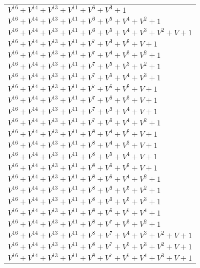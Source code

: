 \documentclass[12pt]{article}
\begin{document}
\begin{adjustwidth}{-4cm}{}
\begin{center}
\begin{longtable}{|l|}
$V^{16}  +V^{14}  +V^{13}  +V^{11}  +V^{6}  +V^{3}  + 1$ \\
$V^{16}  +V^{14}  +V^{13}  +V^{11}  +V^{6}  +V^{5}  +V^{4}  +V^{2}  + 1$ \\
$V^{16}  +V^{14}  +V^{13}  +V^{11}  +V^{6}  +V^{5}  +V^{4}  +V^{3}  +V^{2}  + V + 1$ \\
$V^{16}  +V^{14}  +V^{13}  +V^{11}  +V^{7}  +V^{3}  +V^{2}  + V + 1$ \\
$V^{16}  +V^{14}  +V^{13}  +V^{11}  +V^{7}  +V^{4}  +V^{3}  +V^{2}  + 1$ \\
$V^{16}  +V^{14}  +V^{13}  +V^{11}  +V^{7}  +V^{5}  +V^{3}  +V^{2}  + 1$ \\
$V^{16}  +V^{14}  +V^{13}  +V^{11}  +V^{7}  +V^{5}  +V^{4}  +V^{3}  + 1$ \\
$V^{16}  +V^{14}  +V^{13}  +V^{11}  +V^{7}  +V^{6}  +V^{2}  + V + 1$ \\
$V^{16}  +V^{14}  +V^{13}  +V^{11}  +V^{7}  +V^{6}  +V^{3}  + V + 1$ \\
$V^{16}  +V^{14}  +V^{13}  +V^{11}  +V^{7}  +V^{6}  +V^{4}  + V + 1$ \\
$V^{16}  +V^{14}  +V^{13}  +V^{11}  +V^{7}  +V^{6}  +V^{4}  +V^{2}  + 1$ \\
$V^{16}  +V^{14}  +V^{13}  +V^{11}  +V^{8}  +V^{4}  +V^{2}  + V + 1$ \\
$V^{16}  +V^{14}  +V^{13}  +V^{11}  +V^{8}  +V^{4}  +V^{3}  + V + 1$ \\
$V^{16}  +V^{14}  +V^{13}  +V^{11}  +V^{8}  +V^{5}  +V^{4}  + V + 1$ \\
$V^{16}  +V^{14}  +V^{13}  +V^{11}  +V^{8}  +V^{6}  +V^{2}  + V + 1$ \\
$V^{16}  +V^{14}  +V^{13}  +V^{11}  +V^{8}  +V^{6}  +V^{4}  +V^{2}  + 1$ \\
$V^{16}  +V^{14}  +V^{13}  +V^{11}  +V^{8}  +V^{6}  +V^{5}  +V^{2}  + 1$ \\
$V^{16}  +V^{14}  +V^{13}  +V^{11}  +V^{8}  +V^{6}  +V^{5}  +V^{3}  + 1$ \\
$V^{16}  +V^{14}  +V^{13}  +V^{11}  +V^{8}  +V^{6}  +V^{5}  +V^{4}  + 1$ \\
$V^{16}  +V^{14}  +V^{13}  +V^{11}  +V^{8}  +V^{7}  +V^{3}  +V^{2}  + 1$ \\
$V^{16}  +V^{14}  +V^{13}  +V^{11}  +V^{8}  +V^{7}  +V^{4}  +V^{3}  +V^{2}  + V + 1$ \\
$V^{16}  +V^{14}  +V^{13}  +V^{11}  +V^{8}  +V^{7}  +V^{5}  +V^{3}  +V^{2}  + V + 1$ \\
$V^{16}  +V^{14}  +V^{13}  +V^{11}  +V^{8}  +V^{7}  +V^{5}  +V^{4}  +V^{3}  + V + 1$ \\

\end{longtable}
\end{center}
\end{adjustwidth}
\end{document}
